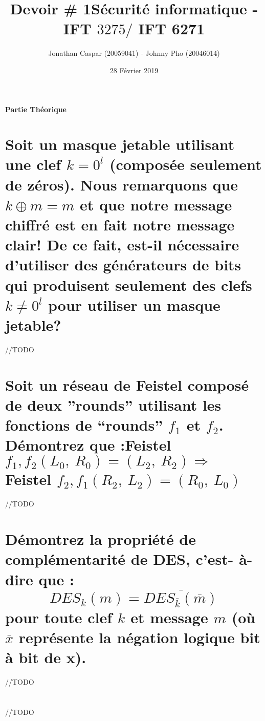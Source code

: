 \documentclass{article}
\title{Devoir \# 1\linebreak S\'{e}curit\'{e} informatique - IFT $3275 /$ IFT 6271}
\author{Jonathan Caspar (20059041) - Johnny Pho (20046014)}
\date{28 Février 2019}
\begin{document}
\maketitle
{\Large\bfseries Partie Théorique\par}

\section{\normalsize Soit un masque jetable utilisant une clef $k = 0^l$
(composée
seulement de zéros). Nous remarquons que $k \oplus m = m$ et que notre
message chiffré est en fait notre message clair! De ce fait, est-il nécessaire
d’utiliser des générateurs de bits qui produisent seulement des clefs $k\neq 0^{l}$
pour utiliser un masque jetable?}

//TODO

\section{\normalsize Soit un r\'{e}seau de Feistel compos\'{e} de deux ''rounds'' utilisant les fonctions de ``rounds'' $f_{1}$ et $f_{2}$. D\'{e}montrez que :\linebreak Feistel $f_{1}, f_{2}(L_{0},\ R_{0})=(L_{2},\ R_{2}) \Rightarrow$ Feistel $f_{2}, f_{1}(R_{2},\ L_{2})=(R_{0},\ L_{0})$}

//TODO

\section{\normalsize  D\'{e}montrez la propri\'{e}t\'{e} de compl\'{e}mentarit\'{e} de DES, c'est- \`{a}-dire que :
$$
DES_{k}(m)=\overline{DES_{\overline{k}}(\overline{m})}
$$
pour toute clef $k$ et message $m$ (o\`{u} $\overline{x}$ repr\'{e}sente la n\'{e}gation logique bit \`{a} bit de x).}

//TODO

\section{\normalsize}

//TODO
\end{document}
